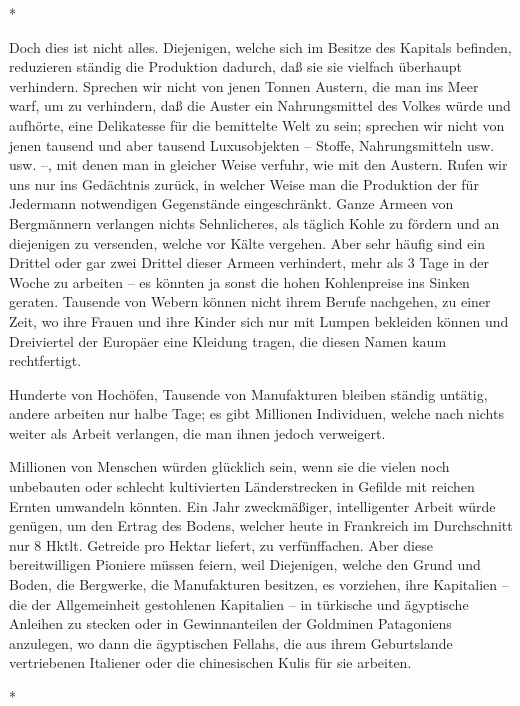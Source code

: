 \documentclass{scrbook}
\begin{document}
\begin{center}*\end{center}

Doch dies ist nicht alles. Diejenigen, welche sich im Besitze des Kapitals befinden, reduzieren ständig die Produktion dadurch, daß sie sie vielfach überhaupt verhindern. Sprechen wir nicht von jenen Tonnen Austern, die man ins Meer warf, um zu verhindern, daß die Auster ein Nahrungsmittel des Volkes würde und aufhörte, eine Delikatesse für die bemittelte Welt zu sein; sprechen wir nicht von jenen tausend und aber tausend Luxusobjekten – Stoffe, Nahrungsmitteln usw. usw. –, mit denen man in gleicher Weise verfuhr, wie mit den Austern. Rufen wir uns nur ins Gedächtnis zurück, in welcher Weise man die Produktion der für Jedermann notwendigen Gegenstände eingeschränkt. Ganze Armeen von Bergmännern verlangen nichts Sehnlicheres, als täglich Kohle zu fördern und an diejenigen zu versenden, welche vor Kälte vergehen. Aber sehr häufig sind ein Drittel oder gar zwei Drittel dieser Armeen verhindert, mehr als 3 Tage in der Woche zu arbeiten – es könnten ja sonst die hohen Kohlenpreise ins Sinken geraten. Tausende von Webern können nicht ihrem Berufe nachgehen, zu einer Zeit, wo ihre Frauen und ihre Kinder sich nur mit Lumpen bekleiden können und Dreiviertel der Europäer eine Kleidung tragen, die diesen Namen kaum rechtfertigt.

Hunderte von Hochöfen, Tausende von Manufakturen bleiben ständig untätig, andere arbeiten nur halbe Tage; es gibt Millionen Individuen, welche nach nichts weiter als Arbeit verlangen, die man ihnen jedoch verweigert.

Millionen von Menschen würden glücklich sein, wenn sie die vielen noch unbebauten oder schlecht kultivierten Länderstrecken in Gefilde mit reichen Ernten umwandeln könnten. Ein Jahr zweckmäßiger, intelligenter Arbeit würde genügen, um den Ertrag des Bodens, welcher heute in Frankreich im Durchschnitt nur 8 Hktlt. Getreide pro Hektar liefert, zu verfünffachen. Aber diese bereitwilligen Pioniere müssen feiern, weil Diejenigen, welche den Grund und Boden, die Bergwerke, die Manufakturen besitzen, es vorziehen, ihre Kapitalien – die der Allgemeinheit gestohlenen Kapitalien – in türkische und ägyptische Anleihen zu stecken oder in Gewinnanteilen der Goldminen Patagoniens anzulegen, wo dann die ägyptischen Fellahs, die aus ihrem Geburtslande vertriebenen Italiener oder die chinesischen Kulis für sie arbeiten.

\begin{center}*\end{center}
\end{document}
